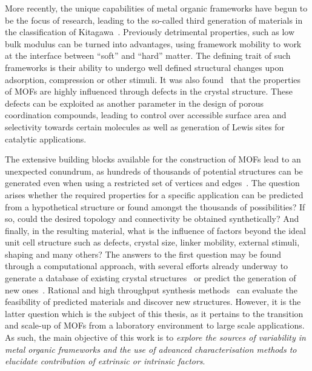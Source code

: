 More recently, the unique capabilities of metal organic frameworks
have begun to be the focus of research, leading to the so-called third 
generation of materials in the classification of 
Kitagawa~\cite{kondoMicroporousMaterialsConstructed2000}.
Previously detrimental properties, such as low bulk modulus
can be turned into advantages, using framework mobility to 
work at the interface between ``soft'' and ``hard'' matter.
The defining trait of such frameworks is their ability to 
undergo well defined structural changes upon adsorption,
compression or other stimuli.
It was also found~\cite{valenzanoDisclosingComplexStructure2011} 
that the properties of \glspl{MOF} are highly influenced
through defects in the crystal structure. These defects 
can be exploited as another parameter in the design of 
porous coordination compounds, leading to control over 
accessible surface area and selectivity towards certain molecules
as well as generation of Lewis sites for catalytic applications.

The extensive building blocks available for the construction 
of \glspl{MOF} lead to an unexpected conundrum, as hundreds of thousands
of potential structures can be generated even when using 
a restricted set of vertices and 
edges~\cite{wilmerLargescaleScreeningHypothetical2012}.
The question arises whether the required properties
for a specific application can be predicted from a hypothetical 
structure or found amongst the thousands of possibilities? 
If so, could the desired topology and connectivity be
obtained synthetically? And finally, in the resulting material,
what is the influence of factors beyond the ideal unit cell 
structure such as defects, crystal size, linker mobility, 
external stimuli, shaping and many others?
The answers to the first question may be found through a 
computational approach, with several efforts already underway 
to generate a database of existing crystal 
structures~\cite{chungComputationReadyExperimentalMetal2014, %
moghadamDevelopmentCambridgeStructural2017}
or predict the generation of new 
ones~\cite{raccugliaMachinelearningassistedMaterialsDiscovery2016}.
Rational and high throughput synthesis
methods~\cite{stockSynthesisMetalOrganicFrameworks2012} can 
evaluate the feasibility of predicted materials and discover 
new structures. However, it is the latter question which is
the subject of this thesis, as it pertains to the transition
and scale-up of \glspl{MOF} from a laboratory environment to 
large scale applications.
As such, the main objective of this work is to 
\textit{explore the sources of variability in metal organic 
frameworks and the use of advanced characterisation methods
to elucidate contribution of extrinsic or intrinsic factors}. 

